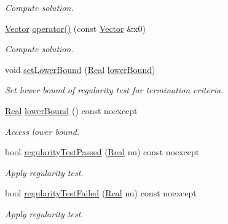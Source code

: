 \begin{DoxyCompactItemize}
\begin{DoxyCompactList}\small\item\em Compute solution. \end{DoxyCompactList}\item 
\hyperlink{classSpacy_1_1Vector}{Vector} \hyperlink{classSpacy_1_1CompositeStep_1_1AffineCovariantSolver_ae08612c2a1ca88d9a3746766bd5c1035_ae08612c2a1ca88d9a3746766bd5c1035}{operator()} (const \hyperlink{classSpacy_1_1Vector}{Vector} \&x0)
\begin{DoxyCompactList}\small\item\em Compute solution. \end{DoxyCompactList}\item 
void \hyperlink{classSpacy_1_1Mixin_1_1RegularityTest_a051394f2ffb0abd9a26ab7a64c590eee_a051394f2ffb0abd9a26ab7a64c590eee}{set\+Lower\+Bound} (\hyperlink{classSpacy_1_1Real}{Real} \hyperlink{classSpacy_1_1Mixin_1_1RegularityTest_a8a807e4449e6b6b64e7e81834d331597_a8a807e4449e6b6b64e7e81834d331597}{lower\+Bound})
\begin{DoxyCompactList}\small\item\em Set lower bound of regularity test for termination criteria. \end{DoxyCompactList}\item 
\hyperlink{classSpacy_1_1Real}{Real} \hyperlink{classSpacy_1_1Mixin_1_1RegularityTest_a8a807e4449e6b6b64e7e81834d331597_a8a807e4449e6b6b64e7e81834d331597}{lower\+Bound} () const noexcept
\begin{DoxyCompactList}\small\item\em Access lower bound. \end{DoxyCompactList}\item 
bool \hyperlink{classSpacy_1_1Mixin_1_1RegularityTest_afe2fd3259850b874a85779d4f562e7f6_afe2fd3259850b874a85779d4f562e7f6}{regularity\+Test\+Passed} (\hyperlink{classSpacy_1_1Real}{Real} nu) const noexcept
\begin{DoxyCompactList}\small\item\em Apply regularity test. \end{DoxyCompactList}\item 
bool \hyperlink{classSpacy_1_1Mixin_1_1RegularityTest_a26217e26765bb6f938224ea76612c8c0_a26217e26765bb6f938224ea76612c8c0}{regularity\+Test\+Failed} (\hyperlink{classSpacy_1_1Real}{Real} nu) const noexcept
\begin{DoxyCompactList}\small\item\em Apply regularity test. \end{DoxyCompactList}\item 

\end{DoxyCompactItemize}
